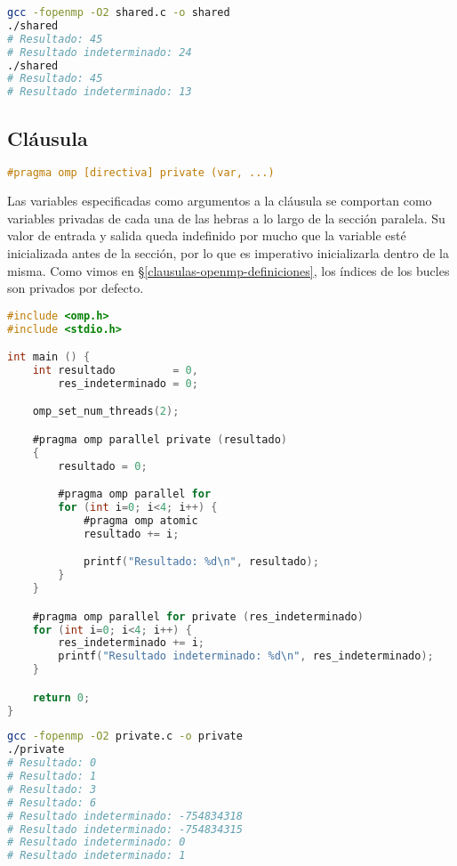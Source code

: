 \begin{lstlisting}[language=sh]
gcc -fopenmp -O2 shared.c -o shared
./shared
# Resultado: 45
# Resultado indeterminado: 24
./shared
# Resultado: 45
# Resultado indeterminado: 13
\end{lstlisting}

\subsection{Cláusula }

\begin{lstlisting}[language=C]
#pragma omp [directiva] private (var, ...)
\end{lstlisting}

Las variables especificadas como argumentos a la cláusula se comportan como variables privadas de cada una de las hebras a lo largo de la sección paralela.
Su valor de entrada y salida queda indefinido por mucho que la variable esté inicializada antes de la sección, por lo que es imperativo inicializarla dentro de la misma.
Como vimos en \S\ref{clausulas-openmp-definiciones}, los índices de los bucles  son privados por defecto.

\begin{lstlisting}[language=C]
#include <omp.h>
#include <stdio.h>

int main () {
	int resultado         = 0,
	    res_indeterminado = 0;

	omp_set_num_threads(2);

	#pragma omp parallel private (resultado)
	{
		resultado = 0;

		#pragma omp parallel for
		for (int i=0; i<4; i++) {
			#pragma omp atomic
			resultado += i;

			printf("Resultado: %d\n", resultado);
		}
	}

	#pragma omp parallel for private (res_indeterminado)
	for (int i=0; i<4; i++) {
		res_indeterminado += i;
		printf("Resultado indeterminado: %d\n", res_indeterminado);
	}

	return 0;
}
\end{lstlisting}

\begin{lstlisting}[language=sh]
gcc -fopenmp -O2 private.c -o private
./private
# Resultado: 0
# Resultado: 1
# Resultado: 3
# Resultado: 6
# Resultado indeterminado: -754834318
# Resultado indeterminado: -754834315
# Resultado indeterminado: 0
# Resultado indeterminado: 1
\end{lstlisting}

